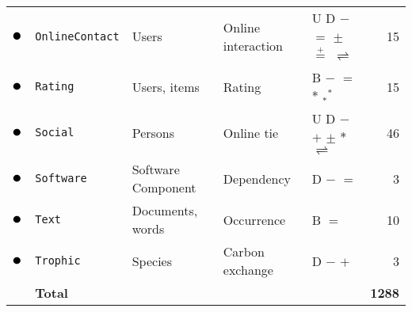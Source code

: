 \begin{tabular}{lllllr}
\textcolor{colorOnlineContact}{$\newmoon$} &\texttt{OnlineContact} & Users & Online interaction & U D \phantom{B} $-$ $=$ \phantom{$+$} $\pm$ $\stackrel{+}{=}$ \phantom{$*$} \phantom{$_*{}^*$} $\rightleftharpoons$ \phantom{$++$}  &  15\\
\textcolor{colorRating}{$\newmoon$} &\texttt{Rating} & Users, items & Rating & \phantom{U} \phantom{D} B $-$ $=$ \phantom{$+$} \phantom{$\pm$} \phantom{$\stackrel{+}{=}$} $*$ $_*{}^*$ \phantom{$\rightleftharpoons$} \phantom{$++$}  &  15\\
\textcolor{colorSocial}{$\newmoon$} &\texttt{Social} & Persons & Online tie & U D \phantom{B} $-$ \phantom{$=$} $+$ $\pm$ \phantom{$\stackrel{+}{=}$} $*$ \phantom{$_*{}^*$} $\rightleftharpoons$ \phantom{$++$}  &  46\\
\textcolor{colorSoftware}{$\newmoon$} &\texttt{Software} & Software Component & Dependency & \phantom{U} D \phantom{B} $-$ $=$ \phantom{$+$} \phantom{$\pm$} \phantom{$\stackrel{+}{=}$} \phantom{$*$} \phantom{$_*{}^*$} \phantom{$\rightleftharpoons$} \phantom{$++$}  &  3\\
\textcolor{colorText}{$\newmoon$} &\texttt{Text} & Documents, words & Occurrence & \phantom{U} \phantom{D} B \phantom{$-$} $=$ \phantom{$+$} \phantom{$\pm$} \phantom{$\stackrel{+}{=}$} \phantom{$*$} \phantom{$_*{}^*$} \phantom{$\rightleftharpoons$} \phantom{$++$}  &  10\\
\textcolor{colorTrophic}{$\newmoon$} &\texttt{Trophic} & Species & Carbon exchange & \phantom{U} D \phantom{B} $-$ \phantom{$=$} $+$ \phantom{$\pm$} \phantom{$\stackrel{+}{=}$} \phantom{$*$} \phantom{$_*{}^*$} \phantom{$\rightleftharpoons$} \phantom{$++$}  &  3\\
\midrule
& \textbf{Total} &&&& \textbf{1288}\\
\bottomrule
\end{tabular}
